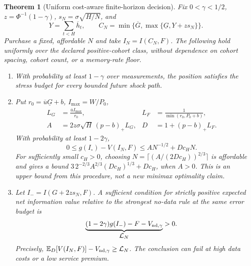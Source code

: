 \documentclass[12pt]{article}
\newtheorem{theorem}{Theorem}
\theoremstyle{definition}
\theoremstyle{remark}
\begin{document}
\begin{theorem}[Uniform cost-aware finite-horizon decision]\label{fhc:decision}
Fix $0<\gamma<1/2$, $z=\Phi^{-1}(1-\gamma)$,
$s_N=\sigma\sqrt{H/N}$, and
\[
 Y=\sum_{t<H}\overline h_t,\qquad
 C_N=\min\{\overline G,\max\{\underline G,Y+zs_N\}\}.
\]
Purchase a fixed, affordable $N$ and take $I_N=I(C_N,F)$.
The following hold uniformly over the declared positive-cohort class,
without dependence on cohort spacing, cohort count, or a memory-rate floor.
\begin{enumerate}
\item With probability at least $1-\gamma$ over measurements, the position
      satisfies the stress budget for \emph{every} bounded future shock path.
\item Put $r_0=\overline u\underline G+b$, $I_{\max}=W/P_0$,
\[
 \begin{aligned}
 L_G&=\frac{\overline u I_{\max}}{r_0}, &
 L_F&=\frac{1}{\min(r_0,P_0+b)},\\
 A&=2z\sigma\sqrt H\,(p-b)_+L_G, & D&=1+(p-b)_+L_F.
 \end{aligned}
\]
With probability at least $1-2\gamma$,
\[
 0\le g(I_\circ)-V(I_N,F)\le A N^{-1/2}+D c_HN.
\]
For sufficiently small $c_H>0$, choosing
$N=\lceil(A/(2Dc_H))^{2/3}\rceil$ is affordable and gives a bound
$3\,2^{-2/3}A^{2/3}(Dc_H)^{1/3}+Dc_H$, when $A>0$.
This is an upper bound from this procedure, not a new minimax optimality claim.
\item Let $I_-=I(G+2zs_N,F)$. A sufficient condition for strictly positive
      expected net information value relative to the strongest no-data rule
      at the \emph{same} error budget is
\[
 \underbrace{(1-2\gamma)g(I_-)-F-V_{{\rm nd},\gamma}}_{\displaystyle\mathcal L_N}>0.
\]
Precisely, $\mathbb E_D[V(I_N,F)]-V_{{\rm nd},\gamma}\ge\mathcal L_N$.
The conclusion can fail at high data costs or a low service premium.
\end{enumerate}
\end{theorem}
\end{document}
